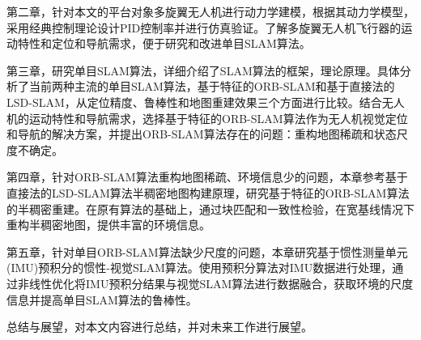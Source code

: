 第二章，针对本文的平台对象多旋翼无人机进行动力学建模，根据其动力学模型，采用经典控制理论设计PID控制率并进行仿真验证。了解多旋翼无人机飞行器的运动特性和定位和导航需求，便于研究和改进单目SLAM算法。

第三章，研究单目SLAM算法，详细介绍了SLAM算法的框架，理论原理。具体分析了当前两种主流的单目SLAM算法，基于特征的ORB-SLAM和基于直接法的LSD-SLAM，从定位精度、鲁棒性和地图重建效果三个方面进行比较。结合无人机的运动特性和导航需求，选择基于特征的ORB-SLAM算法作为无人机视觉定位和导航的解决方案，并提出ORB-SLAM算法存在的问题：重构地图稀疏和状态尺度不确定。

第四章，针对ORB-SLAM算法重构地图稀疏、环境信息少的问题，本章参考基于直接法的LSD-SLAM算法半稠密地图构建原理，研究基于特征的ORB-SLAM算法的半稠密重建。在原有算法的基础上，通过块匹配和一致性检验，在宽基线情况下重构半稠密地图，提供丰富的环境信息。

第五章，针对单目ORB-SLAM算法缺少尺度的问题，本章研究基于惯性测量单元(IMU)预积分的惯性-视觉SLAM算法。使用预积分算法对IMU数据进行处理，通过非线性优化将IMU预积分结果与视觉SLAM算法进行数据融合，获取环境的尺度信息并提高单目SLAM算法的鲁棒性。

总结与展望，对本文内容进行总结，并对未来工作进行展望。

